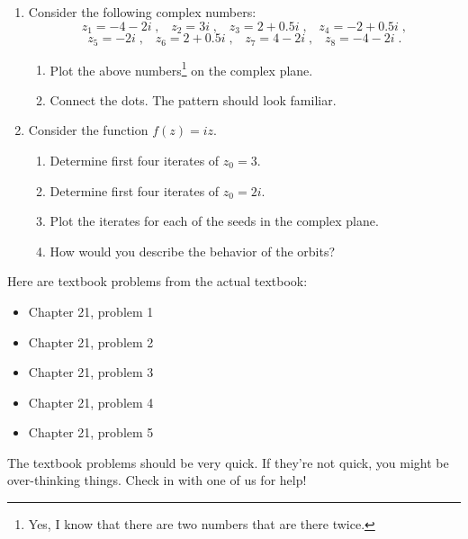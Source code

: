 \documentclass[12pt]{article}
\begin{document}
\begin{enumerate}
\item Consider the following
  complex numbers:
  \begin{equation}
    z_1 = -4 -2i \;,\;\;\; z_2 = 3i \;,\;\;\; z_3 = 2 + 0.5i \;,
    \;\;\;   z_4 = -2 +0.5i \;,
  \end{equation}
  \begin{equation}
  z_5 = -2i \;,\;\;\; z_6 = 2 + 0.5i \;, \;\;\;    z_7 = 4 -2i
  \;,\;\;\; z_8 = -4 -2i \;.
  \end{equation}
    \begin{enumerate}
      \item Plot the above numbers\footnote{Yes, I know
        that there are two numbers that are there twice.} on the complex plane. 
      \item Connect the dots.  The pattern should look familiar.
    \end{enumerate}

  \item Consider the function $f(z) = iz$.
    \begin{enumerate}
      \setlength{\itemsep}{0mm}
    \item Determine first four iterates of $z_0 = 3$.
    \item Determine first four iterates of $z_0 = 2i$.
    \item Plot the iterates for each of the seeds in the complex
      plane.
    \item How would you describe the behavior of the orbits?\\
    \end{enumerate}
      
\end{enumerate}


\noindent Here are textbook problems from the actual textbook:\\

\begin{itemize}
\setlength{\itemsep}{-1mm}
\item Chapter 21, problem 1
\item Chapter 21, problem 2
\item Chapter 21, problem 3
\item Chapter 21, problem 4
\item Chapter 21, problem 5 
\end{itemize}

\noindent The textbook problems should be very quick. If they're not
quick, you might be over-thinking things. Check in with one of us for
help! 
\end{document}
